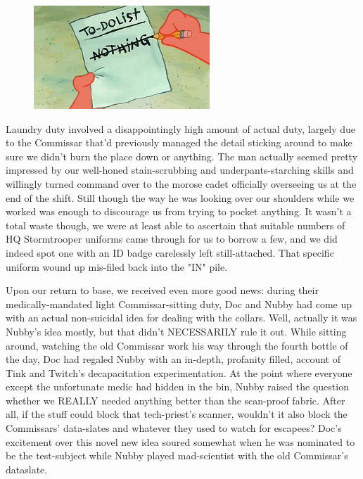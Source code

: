 \begin{figure}
	\begin{center}
		\includegraphics[width=\figwidth]{pics/21/35.png}
	\end{center}
\end{figure}
Laundry duty involved a disappointingly high amount of actual duty, largely due to the Commissar that'd previously managed the detail sticking around to make sure we didn't burn the place down or anything. 
The man actually seemed pretty impressed by our well-honed stain-scrubbing and underpants-starching skills and willingly turned command over to the morose cadet officially overseeing us at the end of the shift. 
Still though the way he was looking over our shoulders while we worked was enough to discourage us from trying to pocket anything. 
It wasn't a total waste though, we were at least able to ascertain that suitable numbers of HQ Stormtrooper uniforms came through for us to borrow a few, and we did indeed spot one with an ID badge carelessly left still-attached. 
That specific uniform wound up mis-filed back into the "IN" pile.

Upon our return to base, we received even more good news: 
during their medically-mandated light Commissar-sitting duty, Doc and Nubby had come up with an actual non-suicidal idea for dealing with the collars. 
Well, actually it was Nubby's idea mostly, but that didn't NECESSARILY rule it out. 
While sitting around, watching the old Commissar work his way through the fourth bottle of the day, Doc had regaled Nubby with an in-depth, profanity filled, account of Tink and Twitch's decapacitation experimentation. 
At the point where everyone except the unfortunate medic had hidden in the bin, Nubby raised the question whether we REALLY needed anything better than the scan-proof fabric. 
After all, if the stuff could block that tech-priest's scanner, wouldn't it also block the Commissars' data-slates and whatever they used to watch for escapees? 
Doc's excitement over this novel new idea soured somewhat when he was nominated to be the test-subject while Nubby played mad-scientist with the old Commissar's dataslate.

